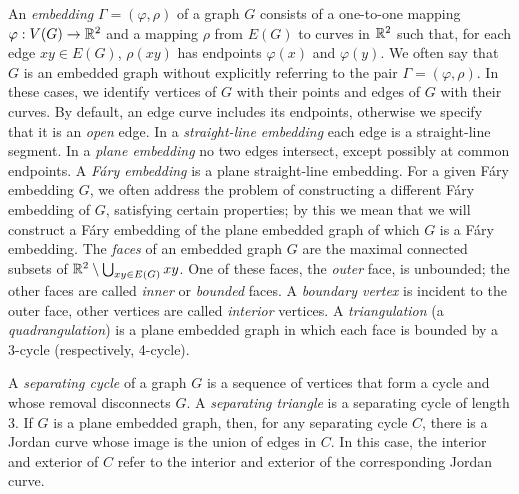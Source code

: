 An \emph{embedding} $\Gamma=(\varphi,\rho)$ of a graph $G$ consists
of a one-to-one mapping $\varphi:V(G)\to\mathbb{R}^2$ and a mapping $\rho$ from
$E(G)$ to curves in $\mathbb{R}^2$ such that, for each edge $xy\in E(G)$, $\rho(xy)$
has endpoints $\varphi(x)$ and $\varphi(y)$.
We often say that $G$ is an embedded graph
without explicitly referring to the pair $\Gamma=(\varphi,\rho)$.
In these cases, we identify vertices of $G$ with their
points and edges of $G$ with their curves. By default, an edge curve includes
its endpoints, otherwise we specify that it is an \emph{open} edge.
%
In a \emph{straight-line embedding} each edge is a straight-line segment. In a \emph{plane embedding} no two edges intersect, except possibly at common endpoints. A \emph{F\'ary embedding} is a plane straight-line embedding. For a given F\'ary embedding $G$, we often address the problem of constructing a different F\'ary embedding of $G$, satisfying certain properties; by this we mean that we will construct a F\'ary embedding of the plane embedded graph of which $G$ is a F\'ary embedding.
%
The \emph{faces} of an embedded graph $G$ are the maximal connected
subsets of $\mathbb{R}^2\setminus\bigcup_{xy\in E(G)} xy$.  One of
these faces, the \emph{outer} face, is unbounded; the other faces are called \emph{inner} or \emph{bounded} faces. A {\em boundary vertex} is incident to the outer face, other vertices are called \emph{interior} vertices.
A \emph{triangulation} (a \emph{quadrangulation}) is a plane embedded graph in which each face is bounded by a 3-cycle (respectively, 4-cycle). 


A \emph{separating cycle} of a graph $G$ is a sequence of vertices
that form a cycle and whose removal disconnects $G$.  A \emph{separating triangle} is
a separating cycle of length 3.  
If $G$ is a plane embedded graph, then,
for any separating cycle $C$, there is a 
Jordan curve whose image
is the union of edges in $C$.  In this case, the interior and exterior of
$C$ refer to the interior and exterior of the corresponding Jordan curve.


